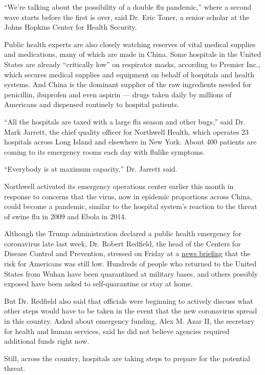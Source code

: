 ``We're talking about the possibility of a double flu pandemic,'' where
a second wave starts before the first is over, said Dr. Eric Toner, a
senior scholar at the Johns Hopkins Center for Health Security.

Public health experts are also closely watching reserves of vital
medical supplies and medications, many of which are made in China. Some
hospitals in the United States are already ``critically low'' on
respirator masks, according to Premier Inc., which secures medical
supplies and equipment on behalf of hospitals and health systems. And
China is the dominant supplier of the raw ingredients needed for
penicillin, ibuprofen and even aspirin --- drugs taken daily by millions
of Americans and dispensed routinely to hospital patients.

``All the hospitals are taxed with a large flu season and other bugs,''
said Dr. Mark Jarrett, the chief quality officer for Northwell Health,
which operates 23 hospitals across Long Island and elsewhere in New
York. About 400 patients are coming to its emergency rooms each day with
flulike symptoms.

``Everybody is at maximum capacity,'' Dr. Jarrett said.

Northwell activated its emergency operations center earlier this month
in response to concerns that the virus, now in epidemic proportions
across China, could become a pandemic, similar to the hospital system's
reaction to the threat of swine flu in 2009 and Ebola in 2014.

Although the Trump administration declared a public health emergency for
coronavirus late last week, Dr. Robert Redfield, the head of the Centers
for Disease Control and Prevention, stressed on Friday at a
\href{https://www.youtube.com/watch?v=NKcUSGk6bdI}{news briefing} that
the risk for Americans was still low. Hundreds of people who returned to
the United States from Wuhan have been quarantined at military bases,
and others possibly exposed have been asked to self-quarantine or stay
at home.

But Dr. Redfield also said that officials were beginning to actively
discuss what other steps would have to be taken in the event that the
new coronavirus spread in this country. Asked about emergency funding,
Alex M. Azar II, the secretary for health and human services, said he
did not believe agencies required additional funds right now.

Still, across the country, hospitals are taking steps to prepare for the
potential threat.

